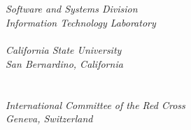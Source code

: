 \begin{titlepage}
\begin{flushright}
\LARGE{}\\
\LARGE{\sffamily{\textbf{\pubnumber}}}\\
\vfill
\Huge{\sffamily{\textbf{\pubtitle}}}\\
    \vfill
\normalsize
\authorone\\
     \textit{Software and Systems Division}\\
     \textit{Information Technology Laboratory}\\
     \vspace{12pt}
\authortwo\\
     \textit{California State University}\\
     \textit{San Bernardino, California}\\
     \vspace{12pt}
\authorthree\\
     \vspace{12pt}
\authorfour\\
    \textit{International Committee of the Red Cross}\\
    \textit{Geneva, Switzerland}\\
    \vspace{12pt}

\end{flushright}
\end{titlepage}
